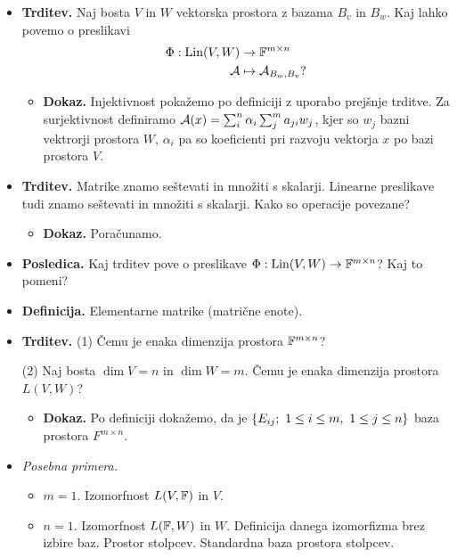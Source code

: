 \begin{enumerate}
\begin{itemize}
        \newpage
        \item \colorbox{blue!30}{\textbf{Trditev.}} Naj bosta $V$ in $W$ vektorska prostora z bazama $B_v$ in $B_w$. Kaj lahko povemo o preslikavi \begin{align*}
            \Phi: \operatorname{Lin}(V, W) &\to \mathbb{F}^{m \times n} \\
            \mathcal{A} &\mapsto \mathcal{A}_{B_w, B_v}?
        \end{align*}
        \begin{itemize}
            \item \colorbox{green!30}{\textbf{Dokaz.}} Injektivnost pokažemo po definiciji z uporabo prejšnje trditve. Za surjektivnost definiramo $\mathcal{A} (x) = \sum_{i}^{n} \alpha_i \sum_{j}^{m} a_{ji}w_j$, kjer so $w_j$ bazni vektrorji prostora $W$, $\alpha_i$ pa so koeficienti pri razvoju vektorja $x$ po bazi prostora $V$.
        \end{itemize}
        \item \colorbox{blue!30}{\textbf{Trditev.}} Matrike znamo seštevati in množiti s skalarji. Linearne preslikave tudi znamo seštevati in množiti s skalarji. Kako so operacije povezane?
        \begin{itemize}
            \item \colorbox{green!30}{\textbf{Dokaz.}} Poračunamo.
        \end{itemize}
        \item \colorbox{orange!30}{\textbf{Posledica.}}  Kaj trditev pove o preslikave $\Phi: \operatorname{Lin}(V, W) \to \mathbb{F}^{m \times n}$? Kaj to pomeni?
        \item \colorbox{purple!30}{\textbf{Definicija.}} Elementarne matrike (matrične enote).
        \item \colorbox{blue!30}{\textbf{Trditev.}} (1) Čemu je enaka dimenzija prostora $\mathbb{F}^{m \times n}$? 
                
        (2) Naj bosta $\dim V = n$ in $\dim W = m$. Čemu je enaka dimenzija prostora $L(V, W)$?
        \begin{itemize}
            \item \colorbox{green!30}{\textbf{Dokaz.}} Po definiciji dokažemo, da je $\left\{E_{ij}; \ 1 \leq i \leq m, \ 1 \leq j \leq n\right\}$ baza prostora $F^{m \times n}$.
        \end{itemize}
        \item \colorbox{yellow!30}{\emph{Posebna primera.}} 
        \begin{itemize}
            \item $m=1$. Izomorfnost $L(V, \mathbb{F})$ in $V$.
            \item $n=1$. Izomorfnost $L(\mathbb{F}, W)$ in $W$. Definicija danega izomorfizma brez izbire baz. Prostor stolpcev. Standardna baza prostora stolpcev. 
        \end{itemize}
    \end{itemize}


\end{enumerate}
